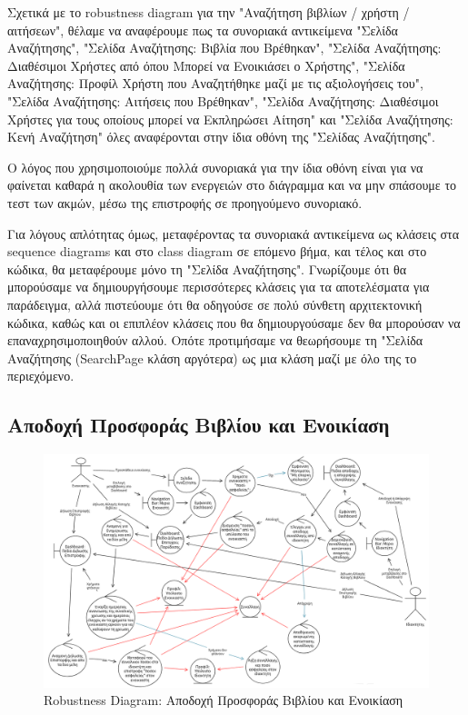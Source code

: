 \documentclass[12pt,a4paper]{article}
\begin{document}
Σχετικά με το robustness diagram για την "Αναζήτηση βιβλίων / χρήστη / αιτήσεων", θέλαμε να αναφέρουμε πως τα συνοριακά αντικείμενα "Σελίδα Αναζήτησης", "Σελίδα Αναζήτησης: Βιβλία που Βρέθηκαν", "Σελίδα Αναζήτησης: Διαθέσιμοι Χρήστες από όπου Μπορεί να Ενοικιάσει ο Χρήστης", "Σελίδα Αναζήτησης: Προφίλ Χρήστη που Αναζητήθηκε μαζί με τις αξιολογήσεις του", "Σελίδα Αναζήτησης: Αιτήσεις που Βρέθηκαν", "Σελίδα Αναζήτησης: Διαθέσιμοι Χρήστες για τους οποίους μπορεί να Εκπληρώσει Αίτηση" και "Σελίδα Αναζήτησης: Κενή Αναζήτηση" όλες αναφέρονται στην ίδια οθόνη της "Σελίδας Αναζήτησης".

Ο λόγος που χρησιμοποιούμε πολλά συνοριακά για την ίδια οθόνη είναι για να φαίνεται καθαρά η ακολουθία των ενεργειών στο διάγραμμα και να μην σπάσουμε το τεστ των ακμών, μέσω της επιστροφής σε προηγούμενο συνοριακό.

Για λόγους απλότητας όμως, μεταφέροντας τα συνοριακά αντικείμενα ως κλάσεις στα sequence diagrams και στο class diagram σε επόμενο βήμα, και τέλος και στο κώδικα, θα μεταφέρουμε μόνο τη "Σελίδα Αναζήτησης". Γνωρίζουμε ότι θα μπορούσαμε να δημιουργήσουμε περισσότερες κλάσεις για τα αποτελέσματα για παράδειγμα, αλλά πιστεύουμε ότι θα οδηγούσε σε πολύ σύνθετη αρχιτεκτονική κώδικα, καθώς και οι επιπλέον κλάσεις που θα δημιουργούσαμε δεν θα μπορούσαν να επαναχρησιμοποιηθούν αλλού. Οπότε προτιμήσαμε να θεωρήσουμε τη "Σελίδα Αναζήτησης (SearchPage κλάση αργότερα) ως μια κλάση μαζί με όλο της το περιεχόμενο.

\subsection{Αποδοχή Προσφοράς Βιβλίου και Ενοικίαση}
\begin{figure}[H]
	\includegraphics[width=\textwidth]{Accept Book Offer and Rent Robustness.png}
	\caption{Robustness Diagram: Αποδοχή Προσφοράς Βιβλίου και Ενοικίαση}
	\label{Robustness Diagram: Αποδοχή Προσφοράς Βιβλίου και Ενοικίαση}
\end{figure}
\label{Rent}
\end{document}
